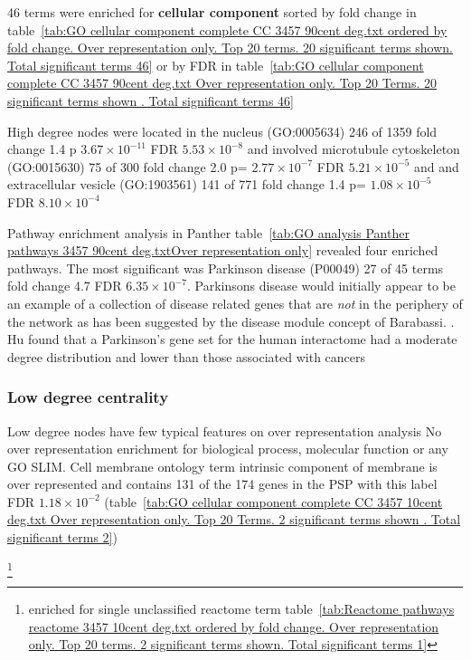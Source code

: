 46 terms were enriched for \textbf{cellular component} sorted by fold change in table~\ref{tab:GO cellular component complete CC 3457 90cent deg.txt ordered by fold change. Over representation only. Top 20 terms. 20 significant terms shown. Total significant terms 46} or by FDR in table~\ref{tab:GO cellular component complete CC 3457 90cent deg.txt Over representation only. Top 20 Terms. 20 significant terms shown . Total significant terms 46}

High degree nodes were located in the  nucleus (GO:0005634) 246 of 1359 fold change 1.4 p $3.67 \times 10^{-11}$ FDR $5.53 \times 10^{-8}$  
and involved  microtubule cytoskeleton (GO:0015630) 75 of 300 fold change 2.0 p= $2.77 \times 10^{-7}$ FDR $5.21 \times 10^{-5}$ and
and  extracellular vesicle (GO:1903561) 141 of 771 fold change 1.4 p= $1.08 \times 10^{-5}$ FDR $8.10 \times 10^{-4}$ 

Pathway enrichment analysis in Panther table~\ref{tab:GO analysis Panther pathways 3457 90cent deg.txtOver representation only} revealed four enriched pathways. The most significant was Parkinson disease (P00049) 27 of 45 terms fold change 4.7 FDR $6.35 \times 10^{-7}$. Parkinsons disease would initially appear to be an example of a collection of disease related genes that are \textit{not} in the periphery of the network as has been suggested by the disease module concept of Barabassi. \cite{barabasi2011network}. Hu found that a Parkinson's gene set for the human interactome had a moderate degree distribution and lower than those associated with cancers \cite{hu2017network}

\subsubsection{Low degree centrality}

Low degree nodes have few typical features on over representation analysis
No over representation enrichment for biological process, molecular function or any GO SLIM. Cell membrane ontology term intrinsic component of membrane is over represented and contains 131 of the 174 genes in the PSP with this label FDR $1.18 \times 10^{-2}$ (table~\ref{tab:GO cellular component complete CC 3457 10cent deg.txt Over representation only. Top 20 Terms. 2 significant terms shown . Total significant terms 2})

\footnote{ enriched for single unclassified reactome term table~\ref{tab:Reactome pathways reactome 3457 10cent deg.txt ordered by fold change. Over representation only. Top 20 terms. 2 significant terms shown. Total significant terms 1}}

